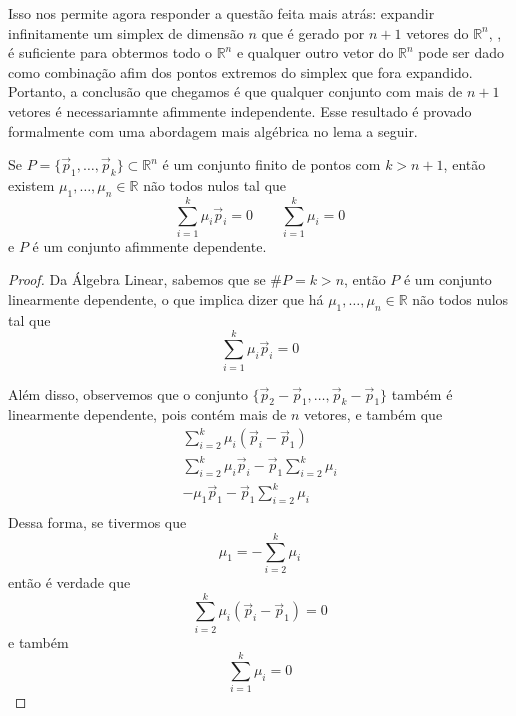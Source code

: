 Isso nos permite agora responder a questão feita mais atrás:
expandir infinitamente um simplex de dimensão $n$ que é gerado
por $n+1$ vetores do  $\mathbb{R}^n$,
, é suficiente para obtermos todo o $\mathbb{R}^n$
e qualquer outro vetor do $\mathbb{R}^n$ pode ser dado como
combinação afim dos pontos extremos do simplex que fora expandido.
Portanto, a conclusão que chegamos é que qualquer conjunto com mais
de $n+1$ vetores é necessariamnte afimmente independente. Esse resultado
é provado formalmente com uma abordagem mais algébrica no lema a seguir.

\begin{lemma:afim}
	\label{lemma:afim}
	Se $P = \{\vec p_1, \ldots, \vec p_k\} \subset \mathbb{R}^n$ é um conjunto
	finito de pontos com $k > n + 1$, então existem $\mu_1, \ldots, \mu_n
	\in \mathbb{R}$ não todos nulos tal que
	\begin{equation*}
		\displaystyle\sum_{i=1}^k \mu_i \vec p_i = 0 \quad\quad \displaystyle\sum_{i=1}^k \mu_i = 0
	\end{equation*}
	e $P$ é um conjunto afimmente dependente.

	\begin{proof}
		Da Álgebra Linear, sabemos que se $\#P = k > n$, então $P$ é um conjunto
		linearmente dependente, o que implica dizer que há $\mu_1, \ldots, \mu_n
		\in \mathbb{R}$ não todos nulos tal que
		\[\displaystyle\sum_{i=1}^k \mu_i \vec p_i = 0\]

		Além disso, observemos que o conjunto $\{\vec p_2 - \vec p_1, \ldots, \vec p_k - \vec p_1\}$
		também é linearmente dependente, pois contém mais de $n$ vetores,
		e também que
		\begin{gather*}
		  \sum_{i=2}^{k} \mu_i (\vec p_i - \vec p_1) \\
		  \sum_{i=2}^{k} \mu_i \vec p_i - \vec p_1 \sum_{i=2}^{k} \mu_i \\
		  - \mu_1 \vec p_1 - \vec p_1 \sum_{i=2}^{k} \mu_i \\
		\end{gather*}
		Dessa forma, se tivermos que
		\[
		  \mu_1 = - \sum_{i=2}^{k} \mu_i
		\]
		então é verdade que
		\[
		  \sum_{i=2}^{k} \mu_i (\vec p_i - \vec p_1) = 0
		\]
		e também
		\[
		  \sum_{i=1}^{k} \mu_i = 0
		\]


\end{proof}
\end{lemma:afim}
